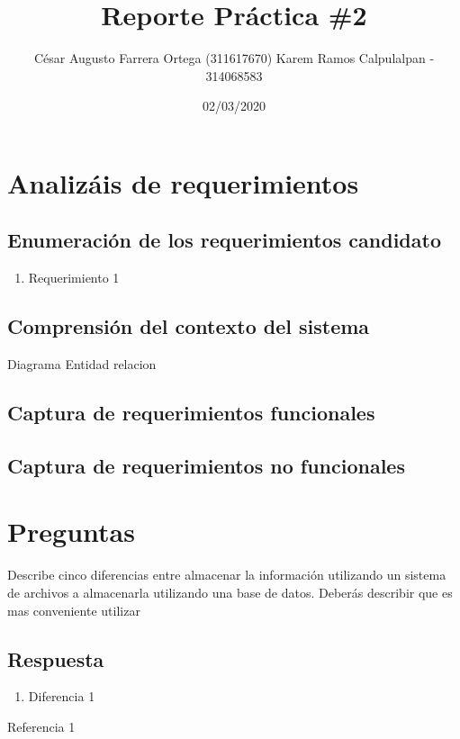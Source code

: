 \documentclass[
	10pt, %
	spanish %
]{fphw}
\title{Reporte Práctica \#2} %
\author{César Augusto Farrera Ortega (311617670)
Karem Ramos Calpulalpan - 314068583} %
\date{02/03/2020} %
\institute{UNAM \\ Facultad de Ciencias} %
\begin{document}
\maketitle %


\section*{Analizáis de requerimientos}


\subsection*{Enumeración de los requerimientos candidato}
\begin{enumerate}
	\item Requerimiento 1
\end{enumerate}

\subsection*{Comprensión del contexto del sistema}

Diagrama Entidad relacion

\subsection*{Captura de requerimientos funcionales}

\subsection*{Captura de requerimientos no funcionales}


\section*{Preguntas}

\begin{problem}
Describe cinco diferencias entre almacenar la información utilizando un sistema de archivos a almacenarla utilizando una base
de datos. Deberás describir que es mas conveniente utilizar
\end{problem}

\subsection*{Respuesta}

\begin{enumerate}
	\item Diferencia 1
\end{enumerate}


\begin{thebibliography}{1}
  		\bibitem {}Referencia 1
  		
\end{thebibliography}
\end{document}
